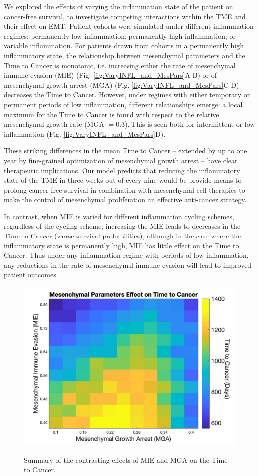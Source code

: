 \documentclass[11pt]{article}
\begin{document}
We explored the effects of varying the inflammation state of the patient on cancer-free survival, to investigate competing interactions within the TME and their effect on EMT. Patient cohorts were simulated under different inflammation regimes: permanently low inflammation; permanently high inflammation; or variable inflammation. For patients drawn from cohorts in a permanently high inflammatory state, the relationship between mesenchymal parameters and the Time to Cancer is monotonic, i.e. increasing either the rate of mesenchymal immune evasion (MIE) (Fig. \ref{fig:VaryINFL_and_MesPars}A-B) or of mesenchymal growth arrest (MGA)  (Fig. \ref{fig:VaryINFL_and_MesPars}C-D) decreases the Time to Cancer.
However, under regimes with either temporary or permanent periods of low inflammation, different relationships emerge: a local maximum for the Time to Cancer is found with respect to the relative mesenchymal growth rate (MGA $= 0.3$). This is seen both for intermittent or low inflammation (Fig. \ref{fig:VaryINFL_and_MesPars}D). 
\par
These striking differences in the mean Time to Cancer -- extended by up to one year by fine-grained optimization of mesenchymal growth arrest -- have clear therapeutic implications. 
Our model predicts that reducing the inflammatory state of the TME in three weeks out of every nine would be provide means to prolong cancer-free survival in combination with mesenchymal cell therapies to make the control of mesenchymal proliferation an effective anti-cancer strategy.
\par
In contrast, when MIE is varied for different inflammation cycling schemes, regardless of the cycling scheme, increasing the MIE leads to decreases in the Time to Cancer (worse survival probabilities), although in the case where the inflammatory state is permanently high, MIE has little effect on the Time to Cancer. Thus under any inflammation regime with periods of low inflammation, any reductions in the rate of mesenchymal immune evasion will lead to improved patient outcomes.


\begin{figure}
\center
{\includegraphics[width=0.5
  \textwidth]{Figure5/MIEvsMGA_bigcbar.jpg}}
\caption{Summary of the contrasting effects of MIE and MGA on the Time to Cancer.
}
\label{fig:MIEvsMGA}
\end{figure}
\end{document}
